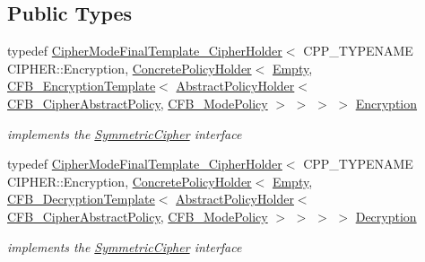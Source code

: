 \subsection*{Public Types}
\begin{DoxyCompactItemize}
\item 
\hypertarget{struct_c_f_b___mode_a98474f28ab6b7370ff86a6dec03d8768}{
typedef \hyperlink{class_cipher_mode_final_template___cipher_holder}{CipherModeFinalTemplate\_\-CipherHolder}$<$ CPP\_\-TYPENAME CIPHER::Encryption, \hyperlink{class_concrete_policy_holder}{ConcretePolicyHolder}$<$ \hyperlink{class_empty}{Empty}, \hyperlink{class_c_f_b___encryption_template}{CFB\_\-EncryptionTemplate}$<$ \hyperlink{class_abstract_policy_holder}{AbstractPolicyHolder}$<$ \hyperlink{class_c_f_b___cipher_abstract_policy}{CFB\_\-CipherAbstractPolicy}, \hyperlink{class_c_f_b___mode_policy}{CFB\_\-ModePolicy} $>$ $>$ $>$ $>$ \hyperlink{struct_c_f_b___mode_a98474f28ab6b7370ff86a6dec03d8768}{Encryption}}
\label{struct_c_f_b___mode_a98474f28ab6b7370ff86a6dec03d8768}

\begin{DoxyCompactList}\small\item\em implements the \hyperlink{class_symmetric_cipher}{SymmetricCipher} interface \item\end{DoxyCompactList}\item 
\hypertarget{struct_c_f_b___mode_a85c215138bc8a9c26ca04a6b1be56d54}{
typedef \hyperlink{class_cipher_mode_final_template___cipher_holder}{CipherModeFinalTemplate\_\-CipherHolder}$<$ CPP\_\-TYPENAME CIPHER::Encryption, \hyperlink{class_concrete_policy_holder}{ConcretePolicyHolder}$<$ \hyperlink{class_empty}{Empty}, \hyperlink{class_c_f_b___decryption_template}{CFB\_\-DecryptionTemplate}$<$ \hyperlink{class_abstract_policy_holder}{AbstractPolicyHolder}$<$ \hyperlink{class_c_f_b___cipher_abstract_policy}{CFB\_\-CipherAbstractPolicy}, \hyperlink{class_c_f_b___mode_policy}{CFB\_\-ModePolicy} $>$ $>$ $>$ $>$ \hyperlink{struct_c_f_b___mode_a85c215138bc8a9c26ca04a6b1be56d54}{Decryption}}
\label{struct_c_f_b___mode_a85c215138bc8a9c26ca04a6b1be56d54}

\begin{DoxyCompactList}\small\item\em implements the \hyperlink{class_symmetric_cipher}{SymmetricCipher} interface \item\end{DoxyCompactList}\end{DoxyCompactItemize}


